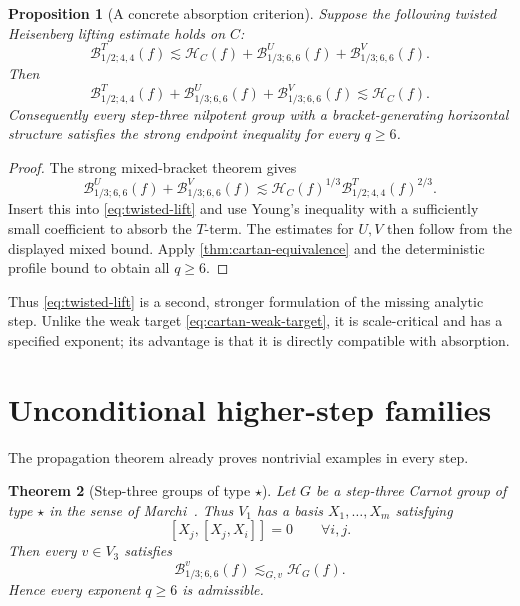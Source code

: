 \documentclass[11pt]{article}
\newtheorem{theorem}{Theorem}[section]
\newtheorem{proposition}[theorem]{Proposition}
\theoremstyle{definition}
\theoremstyle{remark}
\newcommand{\HH}{\mathcal H}
\newcommand{\B}[4]{\mathcal B^{#1}_{#2;#3,#4}}
\newcommand{\less}{\lesssim}
\begin{document}
\begin{proposition}[A concrete absorption criterion]\label{prop:absorption}
Suppose the following twisted Heisenberg lifting estimate holds on \(C\):
\begin{equation}\label{eq:twisted-lift}
 \B{T}{1/2}{4}{4}(f)
 \less \HH_C(f)+\B{U}{1/3}{6}{6}(f)+\B{V}{1/3}{6}{6}(f).
\end{equation}
Then
\begin{equation}\label{eq:cartan-strong-closure}
 \B{T}{1/2}{4}{4}(f)+\B{U}{1/3}{6}{6}(f)+\B{V}{1/3}{6}{6}(f)
 \less \HH_C(f).
\end{equation}
Consequently every step-three nilpotent group with a bracket-generating horizontal
structure satisfies the strong endpoint inequality for every \(q\ge6\).
\end{proposition}

\begin{proof}
The strong mixed-bracket theorem gives
\[
 \B{U}{1/3}{6}{6}(f)+\B{V}{1/3}{6}{6}(f)
 \less \HH_C(f)^{1/3}\B{T}{1/2}{4}{4}(f)^{2/3}.
\]
Insert this into \eqref{eq:twisted-lift} and use Young's inequality with a sufficiently
small coefficient to absorb the \(T\)-term.  The estimates for \(U,V\) then follow from
the displayed mixed bound.  Apply \cref{thm:cartan-equivalence} and the deterministic
profile bound to obtain all \(q\ge6\).
\end{proof}

Thus \eqref{eq:twisted-lift} is a second, stronger formulation of the missing analytic
step.  Unlike the weak target \eqref{eq:cartan-weak-target}, it is scale-critical and has a
specified exponent; its advantage is that it is directly compatible with absorption.

\section{Unconditional higher-step families}\label{sec:families}

The propagation theorem already proves nontrivial examples in every step.

\begin{theorem}[Step-three groups of type \(\star\)]\label{thm:type-star}
Let \(G\) be a step-three Carnot group of type \(\star\) in the sense of
Marchi~\cite{Marchi2014}.  Thus \(V_1\) has a basis \(X_1,\ldots,X_m\) satisfying
\begin{equation}\label{eq:type-star}
 [X_j,[X_j,X_i]]=0\qquad\forall i,j.
\end{equation}
Then every \(v\in V_3\) satisfies
\begin{equation}\label{eq:type-star-q6}
 \B{v}{1/3}{6}{6}(f)\less_{G,v}\HH_G(f).
\end{equation}
Hence every exponent \(q\ge6\) is admissible.
\end{theorem}
\end{document}
